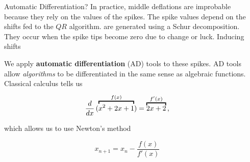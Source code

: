 \documentclass[final]{beamer}
\newlength{\onecolwid}
\newlength{\twocolwid}
\begin{document}
\begin{frame}[t]
\begin{columns}[t]
\begin{column}{\twocolwid}
\begin{columns}[t,totalwidth=\twocolwid]
\begin{column}{\onecolwid}

\end{column} %

\begin{column}{\onecolwid}\vspace{-.6in} %


\begin{block}{Automatic Differentiation?}
In practice, middle deflations are improbable because they rely on the values
of the spikes. The spike values depend on the shifts fed to the $Q R$ algorithm. 
are generated using a Schur decomposition.
They occur when the spike tips become zero due to change or luck. Inducing shifts

\vspace{0.5ex}
\begin{figure}
\end{figure}
\vspace{0.5ex}

We apply \textbf{automatic differentiation} (AD) tools to these spikes. AD tools
allow \emph{algorithms} to be differentiated in the same sense as algebraic
functions. Classical calculus tells us

\begin{equation*}
\frac{d}{dx} \left( \smash{\overbracket{x^2 + 2x + 1}^{f(x)}} \right) =
\overbracket{2x + 2}^{f'(x)}\text{,}
\end{equation*}

which allows us to use Newton's method

\begin{equation}
x_{n+1} = x_n - \frac{f(x)}{f'(x)}
\end{equation}


\end{block}
\end{column}
\end{columns}
\end{column}
\end{columns}
\end{frame}
\end{document}
